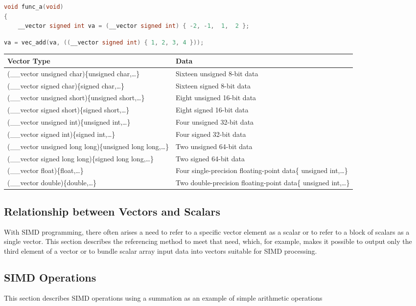 \documentclass{article}
\begin{document}
\begin{lstlisting}[language=C]
void func_a(void)
{
    __vector signed int va = (__vector signed int) { -2, -1,  1,  2 };    
\end{lstlisting}
\begin{lstlisting}[language=C]
va = vec_add(va, ((__vector signed int) { 1, 2, 3, 4 }));   
\end{lstlisting}
\begin{tabularx}{\textwidth}{|X|X|}
\hline
\textbf{Vector Type} & \textbf{Data} \\
\hline

(\_\_vector unsigned char)\{unsigned char,…\} & 	
Sixteen unsigned 8-bit data \\
\hline
(\_\_vector signed char)\{signed char,…\} & 	
Sixteen signed 8-bit data \\ 
\hline
(\_\_vector unsigned short)\{unsigned short,…\} & 	
Eight unsigned 16-bit data \\
\hline
(\_\_vector signed short)\{signed short,…\} & 	
Eight signed 16-bit data \\
\hline
(\_\_vector unsigned int)\{unsigned int,…\} & 	
Four unsigned 32-bit data \\
\hline
(\_\_vector signed int)\{signed int,…\} & 	
Four signed 32-bit data \\
\hline
(\_\_vector unsigned long long)\{unsigned long long,…\} & 	
Two unsigned 64-bit data \\
\hline
(\_\_vector signed long long)\{signed long long,…\} & 	
Two signed 64-bit data \\
\hline
(\_\_vector float)\{float,…\} & 	
Four single-precision floating-point data\{ unsigned int,…\} \\
\hline
(\_\_vector double)\{double,…\} & 	
Two double-precision floating-point data\{ unsigned int,…\} \\
\hline
\end{tabularx}
\subsection{Relationship between Vectors and Scalars}
With SIMD programming, there often arises a need to refer to a specific vector element as a scalar or to refer to a block of scalars as a single vector. This section describes the referencing method to meet that need, which, for example, makes it possible to output only the third element of a vector or to bundle scalar array input data into vectors suitable for SIMD processing.
\subsection{SIMD Operations}
This section describes SIMD operations using a summation as an example of simple arithmetic operations
\end{document}
